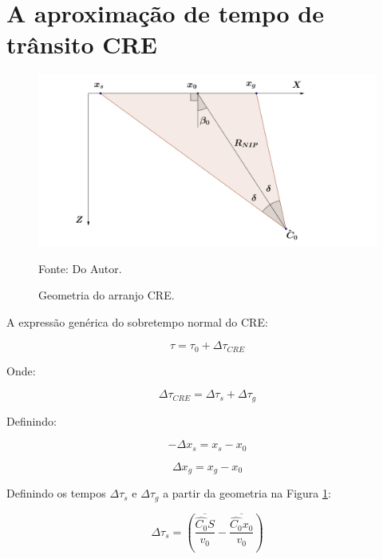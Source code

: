 \documentclass[a4paper, 12pt]{article}
\begin{document}
\section{A aproximação de tempo de trânsito CRE}

\begin{figure}[H]
\caption{Geometria do arranjo CRE.}
\begin{center}
\includegraphics[scale=0.5]{images/creGeom.png}
\vspace{-0.3cm}
\end{center}
\begin{center}
 Fonte: Do Autor.
\end{center}
\label{fig:1.1}
\end{figure}

A expressão genérica do sobretempo normal do CRE:

\begin{equation}
\label{eq:1.1}
\tau = \tau_0 + \Delta \tau_{CRE}
\end{equation}

Onde:

\begin{equation}
\label{eq:1.2}
\Delta \tau_{CRE} = \Delta \tau_s + \Delta \tau_g
\end{equation}

Definindo:

\begin{equation}
\label{eq:1.3}
-\Delta x_s = x_s - x_0
\end{equation}

\begin{equation}
\label{eq:1.4}
\Delta x_g = x_g - x_0
\end{equation}

Definindo os tempos $\Delta \tau_s$ e $\Delta \tau_g$ a partir da geometria na Figura \ref{fig:1.1}:

\begin{equation}
\label{eq:1.5}
\Delta \tau_s = \left( \frac{\overline{\hat{C_0}S}}{v_0} - \frac{\overline{\hat{C_0}x_0}}{v_0} \right)
\end{equation}
\end{document}
